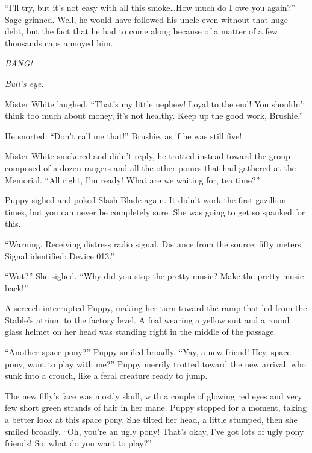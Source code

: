 ``I'll try, but it's not easy with all this smoke\dots How much do I owe you again?'' Sage grinned. Well, he would have followed his uncle even without that huge debt, but the fact that he had to come along because of a matter of a few thousands caps annoyed him.

\emph{BANG! }

\emph{Bull's eye.}

Mister White laughed. ``That's my little nephew! Loyal to the end! You shouldn't think too much about money, it's not healthy. Keep up the good work, Brushie.''

He snorted. ``Don't call me that!'' Brushie, as if he was still five!

Mister White snickered and didn't reply, he trotted instead toward the group composed of a dozen rangers and all the other ponies that had gathered at the Memorial. ``All right, I'm ready! What are we waiting for, tea time?''



\horizonline


Puppy sighed and poked Slash Blade again. It didn't work the first gazillion times, but you can never be completely sure. She was going to get so spanked for this.

{\mten ``Warning. Receiving distress radio signal. Distance from the source: fifty meters. Signal identified: Device 013.''}

``Wut?'' She sighed. ``Why did you stop the pretty music? Make the pretty music back!''

A screech interrupted Puppy, making her turn toward the ramp that led from the Stable's atrium to the factory level. A foal wearing a yellow suit and a round glass helmet on her head was standing right in the middle of the passage.

``Another space pony?'' Puppy smiled broadly. ``Yay, a new friend! Hey, space pony, want to play with me?'' Puppy merrily trotted toward the new arrival, who sunk into a crouch, like a feral creature ready to jump.

The new filly's face was mostly skull, with a couple of glowing red eyes and very few short green strands of hair in her mane. Puppy stopped for a moment, taking a better look at this space pony. She tilted her head, a little stumped, then she smiled broadly. ``Oh, you're an ugly pony! That's okay, I've got lots of ugly pony friends! So, what do you want to play?''

